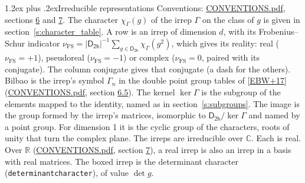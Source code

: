 \documentclass[10pt,a4paper]{article}
\makeatletter
\renewcommand\section{\@startsection{section}{1}{\z@}{-3ex plus -1ex minus -.2ex}%
  {1.2ex plus .2ex}{\normalfont\large\sffamily\bfseries\color{parttitle}}}
\numberwithin{equation}{section}
\newcommand{\grp}[1]{\mathsf{#1}}
\newcommand{\irchar}[1]{\chi_{#1}}
\newcommand{\fsind}{\nu_{\mathrm{FS}}}
\makeatother
\begin{document}
\section{Irreducible representations}\label{s:irreps}
Conventions: \href{../../CONVENTIONS.pdf}{CONVENTIONS.pdf}, sections \href{../../CONVENTIONS.pdf\#conv.6}{6} and \href{../../CONVENTIONS.pdf\#conv.7}{7}.
\leavevmode\label{n:function.character}\label{n:irrep.Gamma}The character $\irchar{\Gamma}(g)$ of the irrep $\Gamma$ on the class of $g$ is given in section~\ref{s:character_table}.
\leavevmode\label{n:index.dimension}\label{n:index.frobenius}\label{n:head.irrep}\label{n:head.reality}A row is an irrep of dimension $d$, with its Frobenius--Schur indicator $\fsind = |\grp{D_{2h}}|^{-1}\allowbreak\sum_{g\in\grp{D_{2h}}}\irchar{\Gamma}(g^2)$, which gives its reality: real ($\fsind = +1$), pseudoreal ($\fsind = -1$) or complex ($\fsind = 0$, paired with its conjugate). \label{n:head.conjugate}The column conjugate gives that conjugate (a dash for the others). \label{n:head.bilbao}\label{n:irrep.alias.gamma}Bilbao is the irrep's symbol $\Gamma_n$ in the double point group tables of [\href{../../../REFERENCES.pdf\#ref.EBW+17}{EBW+17}] (\href{../../CONVENTIONS.pdf}{CONVENTIONS.pdf}, section \href{../../CONVENTIONS.pdf\#conv.6.5}{6.5}). \label{n:head.kernel}The kernel $\ker\Gamma$ is the subgroup of the elements mapped to the identity, named as in section~\ref{s:subgroups}. \label{n:head.image}The image is the group formed by the irrep's matrices, isomorphic to $\grp{D_{2h}}/\ker\Gamma$ and named by a point group. For dimension 1 it is the cyclic group of the characters, roots of unity that turn the complex plane. The irreps are irreducible over $\mathbb{C}$. Each is real. Over $\mathbb{R}$ (\href{../../CONVENTIONS.pdf}{CONVENTIONS.pdf}, section \href{../../CONVENTIONS.pdf\#conv.7}{7}), a real irrep is also an irrep in a basis with real matrices. \label{n:mark.determinant}The boxed irrep is the determinant character (\texttt{determinantcharacter}), of value $\det g$.
\setlength{\emergencystretch}{2em}\par\setlength{\emergencystretch}{0pt}
\end{document}

